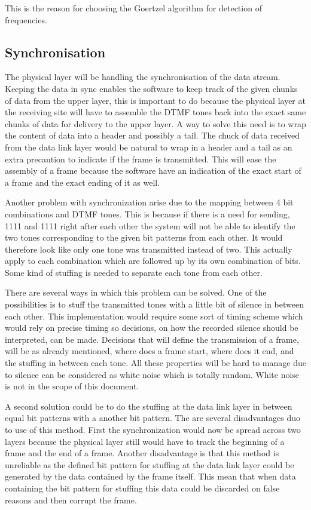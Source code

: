 	This is the reason for choosing the Goertzel algorithm for detection of frequencies.
	
	\subsection{Synchronisation}\label{sec:physical_sync}
	The physical layer will be handling the synchronisation of the data stream. Keeping the data in sync enables the software to
	keep track of the given chunks of data from the upper layer, this is important to do because the physical layer at the receiving
	site will have to assemble the DTMF tones back into the exact same chunks of data for delivery to the upper layer.
	A way to solve this need is to wrap the content of data into a header and possibly a tail. The chuck of data received from the 
	data link layer would be natural to wrap in a header and a tail as an extra precaution to indicate if the frame is transmitted.
	This will ease the assembly of a frame because the software have an indication of the exact start of a frame and the exact ending
	of it as well.
	
	Another problem with synchronization arise due to the mapping between 4 bit combinations and DTMF tones. This is because if there is a
	need for sending, 1111 and 1111 right after each other the system will not be able to identify the two tones corresponding to the
	given bit patterns from each other. It would therefore look like only one tone was transmitted instead of two. This actually apply
	to each combination which are followed up by its own combination of bits. Some kind of stuffing is needed to separate each tone
	from each other.
	
	There are several ways in which this problem can be solved. One of the possibilities is to stuff the transmitted tones with a little
	bit of silence in between each other. This implementation would require some sort of timing scheme which would rely on precise timing
	so decisions, on how the recorded silence should be interpreted, can be made. Decisions that will define the transmission of a frame, will be as 
	already mentioned, where does a frame start, where does it end, and the stuffing in between each tone. All these properties will be
	hard to manage due to silence can be considered as white noise which is totally random. White noise is not in the scope of this 
	document.
	
	A second solution could be to do the stuffing at the data link layer in between equal bit patterns with a another bit pattern. 
	The are several disadvantages duo to use of this method. First the synchronization would now be spread across two layers because
	the physical layer still would have to track the beginning of a frame and the end of a frame. Another disadvantage is that this 
	method is unreliable as the defined bit pattern for stuffing at the data link layer could be generated by the data contained by the 
	frame itself. This mean that when data containing the bit pattern for stuffing this data could be discarded on false reasons and
	then corrupt the frame.
	
